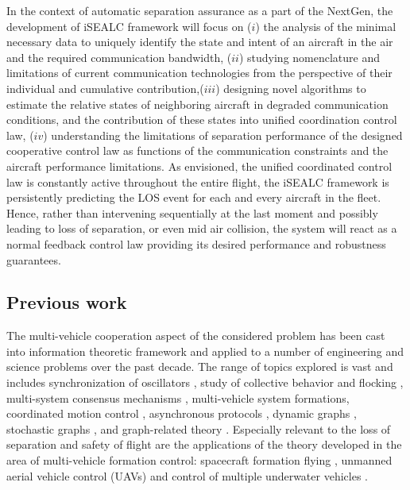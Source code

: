 \documentclass[letter,onecolumn,12pt]{aiaa-tc}
\newcommand{\1}{1_n}
\begin{document}
In the context of automatic separation assurance as a part of the NextGen, the development of iSEALC framework will focus on ($i$) the analysis of the minimal necessary data to uniquely identify the state and intent of an aircraft in the air and the required communication bandwidth, ($ii$) studying nomenclature and limitations of current communication technologies from the perspective of their individual and cumulative contribution,($iii$) designing novel algorithms to estimate the relative states of  neighboring aircraft in degraded communication conditions, and the contribution of these states into unified coordination control law, ($iv$) understanding the limitations of separation performance of the designed cooperative control law as functions of the communication constraints and the aircraft performance limitations. As envisioned, the unified coordinated control law is constantly active throughout the entire flight, the iSEALC framework is persistently predicting the LOS event for each and every aircraft in the fleet. Hence, rather than intervening sequentially at the last moment and possibly leading to loss of separation, or even mid air collision, the system will react as a normal feedback control law providing its desired performance and robustness guarantees.

\subsection{Previous work}
\label{subsec:envisioned_solution}
The multi-vehicle cooperation aspect of the considered problem has been cast into information theoretic framework and applied to a number of engineering and science problems over the past decade. The range of topics explored is vast and includes synchronization of oscillators \cite{Sepulchre}, study of collective behavior and flocking
\cite{jadbabaie03}, multi-system consensus mechanisms \cite{lin05}, multi-vehicle system formations\cite{egerstedt01},
coordinated motion control \cite{ghabcheloo06}, asynchronous protocols \cite{Fang}, dynamic graphs \cite{mesbahi},
stochastic graphs \cite{mesbahi, Stilwell, Stilwell2}, and graph-related theory \cite{caom, Kim-Meshabi}.
Especially relevant to the loss of separation and safety of flight are the applications of the theory developed in the area of multi-vehicle formation control: spacecraft formation flying \cite{mesbahi-hadaegh}, unmanned aerial vehicle control (UAVs) \cite{Song, Stipanovic} and control of multiple underwater vehicles \cite{pereira}.
\end{document}
